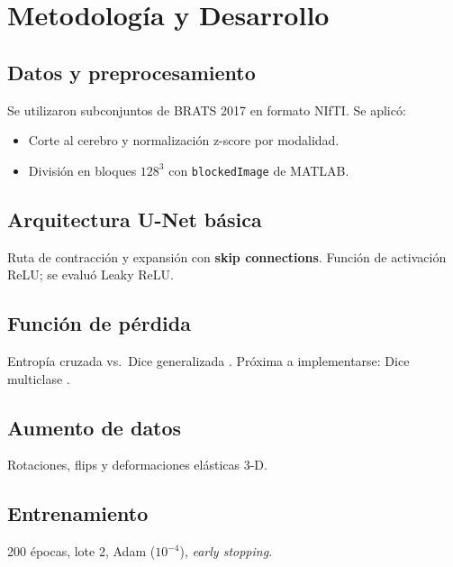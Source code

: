 \chapter{Metodología y Desarrollo}

\section{Datos y preprocesamiento}
Se utilizaron subconjuntos de BRATS 2017 en formato NIfTI. Se aplicó:
\begin{itemize}
  \item Corte al cerebro y normalización z-score por modalidad.
  \item División en bloques $128^3$ con \verb|blockedImage| de MATLAB.
\end{itemize}

\section{Arquitectura U-Net básica}
Ruta de contracción y expansión con \textbf{skip connections}.
Función de activación ReLU; se evaluó Leaky ReLU.

\section{Función de pérdida}
Entropía cruzada vs.\ Dice generalizada \cite{sudre2017generalizeddice}.
Próxima a implementarse: Dice multiclase \cite{isensee2018brats}.

\section{Aumento de datos}
Rotaciones, flips y deformaciones elásticas 3-D.

\section{Entrenamiento}
200 épocas, lote 2, Adam ($10^{-4}$), \textit{early stopping}.
